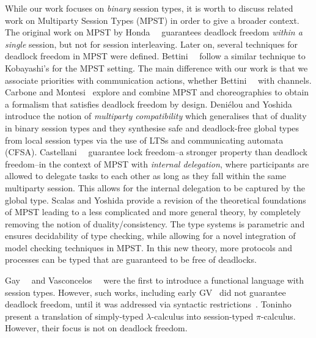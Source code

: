 \documentclass[main.tex]{subfiles}
\begin{document}
While our work focuses on \emph{binary} session types, it is worth to discuss related work on Multiparty Session Types (MPST) in order to give a broader context. The original work on MPST by Honda~\etal~\cite{hondayoshida08} guarantees deadlock freedom \emph{within a single} session, but not for session interleaving.
Later on, several techniques for deadlock freedom in MPST were defined.
Bettini~\etal~\cite{bettinicoppo08} follow a similar technique to Kobayashi's for the MPST setting. The main difference with our work is that we associate priorities with communication actions, whether Bettini~\etal~\cite{bettinicoppo08} with channels. Carbone and Montesi~\cite{carbonemontesi13} explore and combine MPST and choreographies to obtain a formalism that satisfies deadlock freedom by design.
Deni{\'{e}}lou and Yoshida \cite{DenielouY13} introduce the notion of \emph{multiparty compatibility} which generalises that of duality in binary session types and they synthesise safe and deadlock-free global types from local session types via the use of LTSs and communicating automata (CFSA).
Castellani~\etal~\cite{CastellaniDGH20} guarantee lock freedom--a stronger property than deadlock freedom--in the context of MPST with \emph{internal delegation}, where participants are allowed to delegate tasks to each other as long as they fall within the same multiparty session. This allows for the internal delegation to be captured by the global type.
Scalas and Yoshida \cite{scalasyoshida19} provide a revision of the theoretical foundations of MPST leading to a less complicated and more general theory, by completely removing the notion of duality/consistency. The type systems is parametric and ensures decidability of type checking, while allowing for a novel integration of model checking techniques in MPST. In this new theory, more protocols and processes can be typed that are guaranteed to be free of deadlocks.

Gay~\etal~\cite{gaynagarajan03} and Vasconcelos~\etal~\cite{vasconcelosravara04,vasconcelosgay06} were the first to introduce a functional language with session types. However, such works, including early GV~\cite{gayvasconcelos12} did not guarantee deadlock freedom, until it was addressed via syntactic restrictions~\cite{lindleymorris15,wadler14}. Toninho~\etal~\cite{toninhocaires12} present a translation of simply-typed $\lambda$-calculus into session-typed $\pi$-calculus. However, their focus is not on deadlock freedom.
\end{document}
